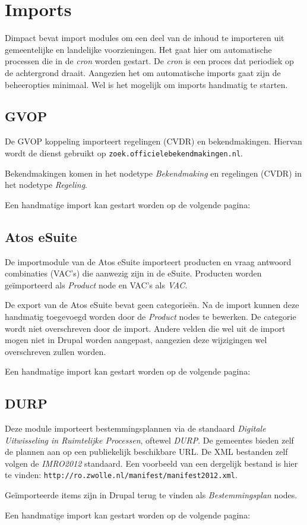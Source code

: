 \section{Imports}

Dimpact bevat import modules om een deel van de inhoud te importeren uit gemeentelijke en landelijke voorzieningen. Het gaat hier om automatische processen die in de \emph{cron} worden gestart. De \emph{cron} is een proces dat periodiek op de achtergrond draait. Aangezien het om automatische imports gaat zijn de beheeropties minimaal. Wel is het mogelijk om imports handmatig te starten.

\subsection{GVOP}

De GVOP koppeling importeert regelingen (CVDR) en bekendmakingen. Hiervan wordt de dienst gebruikt op \texttt{zoek.officielebekendmakingen.nl}.

Bekendmakingen komen in het nodetype \emph{Bekendmaking} en regelingen (CVDR) in het nodetype \emph{Regeling}.

Een handmatige import kan gestart worden op de volgende pagina: \\

\subsection{Atos eSuite}

De importmodule van de Atos eSuite importeert producten en vraag antwoord combinaties (VAC's) die aanwezig zijn in de eSuite. Producten worden ge\"{i}mporteerd als \emph{Product} node en VAC's als \emph{VAC}.

De export van de Atos eSuite bevat geen categorie\"{e}n. Na de import kunnen deze handmatig toegevoegd worden door de \emph{Product} nodes te bewerken. De categorie wordt niet overschreven door de import. Andere velden die wel uit de import mogen niet in Drupal worden aangepast, aangezien deze wijzigingen wel overschreven zullen worden.

Een handmatige import kan gestart worden op de volgende pagina: \\

\subsection{DURP}

Deze module importeert bestemmingsplannen via de standaard \emph{Digitale Uitwisseling in Ruimtelijke Processen}, oftewel \emph{DURP}. De gemeentes bieden zelf de plannen aan op een publiekelijk beschikbare URL. De XML bestanden zelf volgen de \emph{IMRO2012} standaard. Een voorbeeld van een dergelijk bestand is hier te vinden:
\texttt{http://ro.zwolle.nl/manifest/manifest2012.xml}.

Ge\"{i}mporteerde items zijn in Drupal terug te vinden als \emph{Bestemmingsplan} nodes.

Een handmatige import kan gestart worden op de volgende pagina: \\
